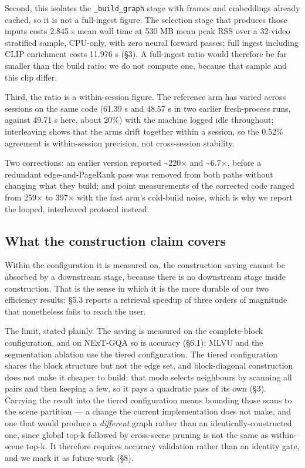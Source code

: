 \documentclass[sigconf,review,anonymous]{acmart}
\begin{document}
Second, this isolates the \texttt{\_build\_graph} stage with frames and embeddings already cached, so
it is not a full-ingest figure. The selection stage that produces those inputs costs 2.845 s
mean wall time at 530 MB mean peak RSS over a 32-video stratified sample, CPU-only, with
zero neural forward passes; full ingest including CLIP enrichment costs
11.976 s (§3). A full-ingest ratio would therefore be far smaller than the build ratio; we do
not compute one, because that sample and this clip differ.

Third, the ratio is a within-session figure. The reference arm has varied across sessions on
the same code (61.39 s and 48.57 s in two earlier fresh-process runs, against 49.71 s here,
about 20\%) with the machine logged idle throughout; interleaving shows that the arms drift
together within a session, so the 0.52\% agreement is within-session precision, not
cross-session stability.

Two corrections: an earlier version reported \textasciitilde220\ensuremath{\times} and \textasciitilde6.7\ensuremath{\times}, before a redundant
edge-and-PageRank pass was removed from both paths without changing what they build; and
point measurements of the corrected code ranged from 259\ensuremath{\times} to 397\ensuremath{\times} with the fast arm's
cold-build noise, which is why we report the looped, interleaved protocol instead.

\subsection{What the construction claim covers}

Within the configuration it is measured on, the construction saving cannot be absorbed by a
downstream stage, because there is no downstream stage inside construction. That is the
sense in which it is the more durable of our two efficiency results: §5.3 reports a
retrieval speedup of three orders of magnitude that nonetheless fails to reach the user.

The limit, stated plainly. The saving is measured on the complete-block configuration, and on
NExT-GQA so is accuracy (§6.1); MLVU and the segmentation ablation use the tiered
configuration. The tiered configuration shares the block structure but not the edge set, and
block-diagonal construction does not make it cheaper to build: that mode selects neighbours by scanning all pairs and then keeping a few,
so it pays a quadratic pass of its own (§3). Carrying the result into the tiered
configuration means bounding those scans to the scene partition --- a change the current
implementation does not make, and one that would produce a \emph{different} graph rather than an
identically-constructed one, since global top-k followed by cross-scene pruning is not the
same as within-scene top-k. It therefore requires accuracy validation rather than an
identity gate, and we mark it as future work (§8).
\end{document}

